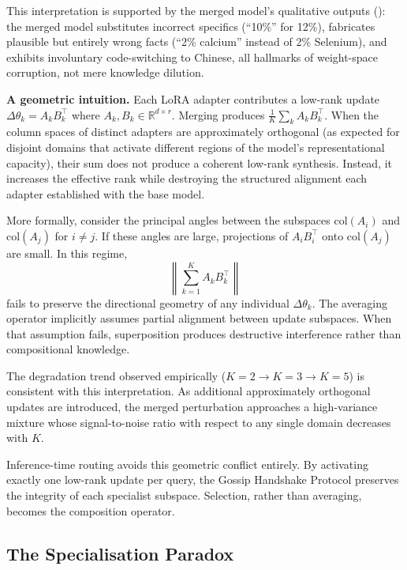 \documentclass[conference, 10pt]{IEEEtran}
\begin{document}
This interpretation is supported by the merged model's qualitative
outputs (): the merged model substitutes
incorrect specifics (``10\%'' for 12\%), fabricates plausible but
entirely wrong facts (``2\% calcium'' instead of 2\% Selenium),
and exhibits involuntary code-switching to Chinese, all hallmarks
of weight-space corruption, not mere knowledge dilution.

\textbf{A geometric intuition.}
Each LoRA adapter contributes a low-rank update
$\Delta\theta_k = A_k B_k^\top$ where $A_k, B_k \in \mathbb{R}^{d \times r}$.
Merging produces $\frac{1}{K}\sum_k A_k B_k^\top$.
When the column spaces of distinct adapters are approximately
orthogonal (as expected for disjoint domains that activate
different regions of the model's representational capacity), their
sum does not produce a coherent low-rank synthesis.
Instead, it increases the effective rank while destroying the
structured alignment each adapter established with the base model.

More formally, consider the principal angles between the subspaces
$\mathrm{col}(A_i)$ and $\mathrm{col}(A_j)$ for $i \neq j$.
If these angles are large, projections of $A_i B_i^\top$ onto
$\mathrm{col}(A_j)$ are small.
In this regime,
\[
\left\| \sum_{k=1}^{K} A_k B_k^\top \right\|
\]
fails to preserve the directional geometry of any individual
$\Delta\theta_k$.
The averaging operator implicitly assumes partial alignment
between update subspaces.
When that assumption fails, superposition produces destructive
interference rather than compositional knowledge.

The degradation trend observed empirically
($K=2 \rightarrow K=3 \rightarrow K=5$)
is consistent with this interpretation.
As additional approximately orthogonal updates are introduced,
the merged perturbation approaches a high-variance mixture whose
signal-to-noise ratio with respect to any single domain decreases
with $K$.

Inference-time routing avoids this geometric conflict entirely.
By activating exactly one low-rank update per query, the
Gossip Handshake Protocol preserves the integrity of each
specialist subspace.
Selection, rather than averaging, becomes the composition operator.

\subsection{The Specialisation Paradox}
\label{sec:specialisation-paradox}
\end{document}
